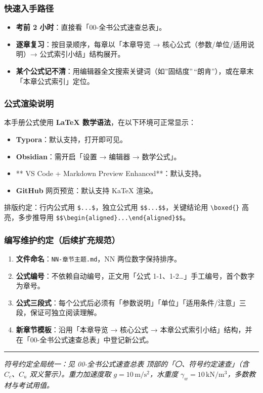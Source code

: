 \documentclass[
]{article}
\providecommand{\tightlist}{%
  \setlength{\itemsep}{0pt}\setlength{\parskip}{0pt}}
\begin{document}
\subsubsection{快速入手路径}\label{ux5febux901fux5165ux624bux8defux5f84}

\begin{itemize}
\tightlist
\item
  \textbf{考前 2 小时}：直接看「00-全书公式速查总表」。
\item
  \textbf{逐章复习}：按目录顺序，每章以「本章导览 →
  核心公式（参数/单位/适用说明）→ 公式索引小结」结构展开。
\item
  \textbf{某个公式记不清}：用编辑器全文搜索关键词（如''固结度''\,``朗肯''），或在章末「本章公式索引」定位。
\end{itemize}

\subsubsection{公式渲染说明}\label{ux516cux5f0fux6e32ux67d3ux8bf4ux660e}

本手册公式使用 \textbf{LaTeX 数学语法}，在以下环境可正常显示：

\begin{itemize}
\tightlist
\item
  \textbf{Typora}：默认支持，打开即可见。
\item
  \textbf{Obsidian}：需开启「设置 → 编辑器 → 数学公式」。
\item
  ** VS Code + Markdown Preview Enhanced**：默认支持。
\item
  \textbf{GitHub} 网页预览：默认支持 KaTeX 渲染。
\end{itemize}

排版约定：行内公式用 \texttt{\$...\$}，独立公式用
\texttt{\$\$...\$\$}，关键结论用 \texttt{\textbackslash{}boxed\{\}}
高亮，多步推导用
\texttt{\$\$\textbackslash{}begin\{aligned\}...\textbackslash{}end\{aligned\}\$\$}。

\subsubsection{编写维护约定（后续扩充规范）}\label{ux7f16ux5199ux7ef4ux62a4ux7ea6ux5b9aux540eux7eedux6269ux5145ux89c4ux8303}

\begin{enumerate}
\def\labelenumi{\arabic{enumi}.}
\tightlist
\item
  \textbf{文件命名}：\texttt{NN-章节主题.md}，NN 两位数字保持排序。
\item
  \textbf{公式编号}：不依赖自动编号，正文用「公式
  1-1、1-2\ldots」手工编号，首个数字为章号。
\item
  \textbf{公式三段式}：每个公式后必须有「参数说明」「单位」「适用条件/注意」三段，保证可独立阅读理解。
\item
  \textbf{新章节模板}：沿用「本章导览 → 核心公式 →
  本章公式索引小结」结构，并在「00-全书公式速查总表」中登记新公式。
\end{enumerate}

\begin{center}\rule{0.5\linewidth}{0.5pt}\end{center}

\emph{符号约定全局统一：见 00-全书公式速查总表
顶部的「〇、符号约定速查」（含 \(C_c\)、\(C_u\) 双义警示）。重力加速度取
\(g=10\,\mathrm{m/s^2}\)，水重度
\(\gamma_w=10\,\mathrm{kN/m^3}\)，多数教材与考试用值。}
\end{document}
